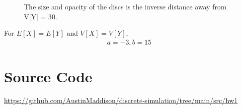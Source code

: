 \documentclass[twocolumn]{article}
\begin{document}
\begin{figure}[H]
    \centering
    \caption{The size and opacity of the discs is the inverse distance away from V[Y] = 30.}
\end{figure}

\noindent
For $E[X]=E[Y]$ and $V[X]=V[Y]$,
\begin{align*}
a=-3, b=15
\end{align*}


\section*{Source Code}
\href{https://github.com/AustinMaddison/discrete-simulation/tree/main/src/hw1}{https://github.com/AustinMaddison/discrete-simulation/tree/main/src/hw1}

%
%
\end{document}
